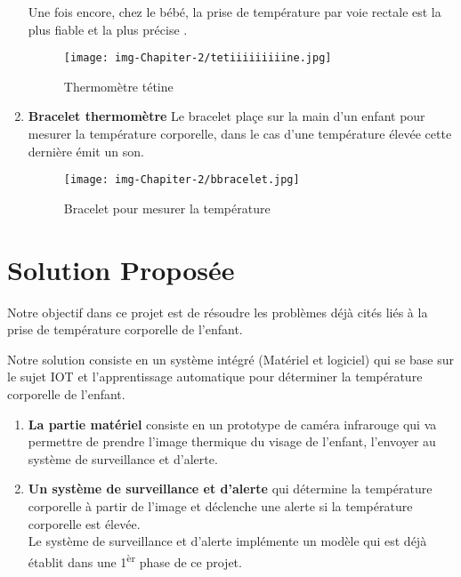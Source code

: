 \documentclass[12pt]{article}
\begin{document}
\begin{enumerate}
Une fois encore, chez le bébé, la prise de température par voie rectale est la plus fiable et la plus précise \cite{36}.

\begin{figure}[h]
	\centering
	\texttt{[image: img-Chapiter-2/tetiiiiiiiiine.jpg]}
	\caption{Thermomètre tétine}
\end{figure}
	\item \textbf{Bracelet thermomètre} Le bracelet plaçe sur la main d'un enfant pour mesurer la température corporelle, dans le cas d'une température élevée cette dernière émit un son.
	\begin{figure}[h]
		\centering
		\texttt{[image: img-Chapiter-2/bbracelet.jpg]}
		\caption{Bracelet pour mesurer la température}
	\end{figure}
\end{enumerate}

\section{Solution Proposée}
Notre objectif dans ce projet est de résoudre les problèmes déjà cités liés à la prise de température corporelle de l'enfant.

Notre solution consiste en un système intégré (Matériel et logiciel) qui se base sur le sujet IOT et l'apprentissage automatique pour déterminer la température corporelle de l'enfant.
\begin{enumerate}
	\item \textbf{La partie matériel} consiste en un prototype de caméra infrarouge qui va permettre de prendre l'image thermique du visage de l'enfant, l'envoyer au système de surveillance et  d'alerte.
	\item \textbf{Un système de surveillance et d'alerte} qui détermine la température corporelle à partir de l'image et déclenche une alerte si la température corporelle est élevée.\\
	Le système de surveillance et d'alerte implémente un modèle qui est déjà établit dans une 1\textsuperscript{èr} phase de ce projet.
\end{enumerate}
\end{document}
